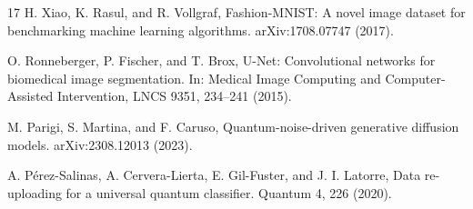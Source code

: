 \documentclass[runningheads]{llncs}
\begin{document}
\begin{thebibliography}{17}
H. Xiao, K. Rasul, and R. Vollgraf,
Fashion-MNIST: A novel image dataset for benchmarking machine learning algorithms.
arXiv:1708.07747 (2017).

O. Ronneberger, P. Fischer, and T. Brox,
U-Net: Convolutional networks for biomedical image segmentation.
In: Medical Image Computing and Computer-Assisted Intervention, LNCS 9351, 234--241 (2015).

M. Parigi, S. Martina, and F. Caruso,
Quantum-noise-driven generative diffusion models.
arXiv:2308.12013 (2023).

A. P\'erez-Salinas, A. Cervera-Lierta, E. Gil-Fuster, and J. I. Latorre,
Data re-uploading for a universal quantum classifier.
Quantum 4, 226 (2020).
\end{thebibliography}
\end{document}

